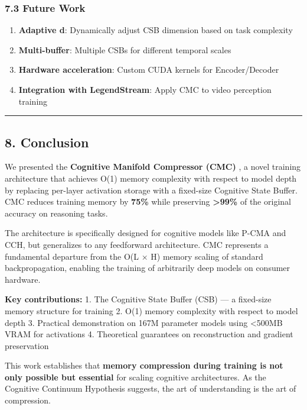\documentclass[
  11pt,
  a4paper,
]{article}
\providecommand{\tightlist}{%
  \setlength{\itemsep}{0pt}\setlength{\parskip}{0pt}}
\begin{document}
\subsubsection{7.3 Future Work}\label{future-work}

\begin{enumerate}
\def\labelenumi{\arabic{enumi}.}
\tightlist
\item
  \textbf{Adaptive d}: Dynamically adjust CSB dimension based on task
  complexity
\item
  \textbf{Multi-buffer}: Multiple CSBs for different temporal scales
\item
  \textbf{Hardware acceleration}: Custom CUDA kernels for
  Encoder/Decoder
\item
  \textbf{Integration with LegendStream}: Apply CMC to video perception
  training
\end{enumerate}

\begin{center}\rule{0.5\linewidth}{0.5pt}\end{center}

\subsection{8. Conclusion}\label{conclusion}

We presented the \textbf{Cognitive Manifold Compressor (CMC)} , a novel
training architecture that achieves O(1) memory complexity with respect
to model depth by replacing per-layer activation storage with a
fixed-size Cognitive State Buffer. CMC reduces training memory by
\textbf{75\%} while preserving \textbf{\textgreater99\%} of the original
accuracy on reasoning tasks.

The architecture is specifically designed for cognitive models like
P-CMA and CCH, but generalizes to any feedforward architecture. CMC
represents a fundamental departure from the O(L × H) memory scaling of
standard backpropagation, enabling the training of arbitrarily deep
models on consumer hardware.

\textbf{Key contributions:} 1. The Cognitive State Buffer (CSB) --- a
fixed-size memory structure for training 2. O(1) memory complexity with
respect to model depth 3. Practical demonstration on 167M parameter
models using \textless500MB VRAM for activations 4. Theoretical
guarantees on reconstruction and gradient preservation

This work establishes that \textbf{memory compression during training is
not only possible but essential} for scaling cognitive architectures. As
the Cognitive Continuum Hypothesis suggests, the art of understanding is
the art of compression.
\end{document}
